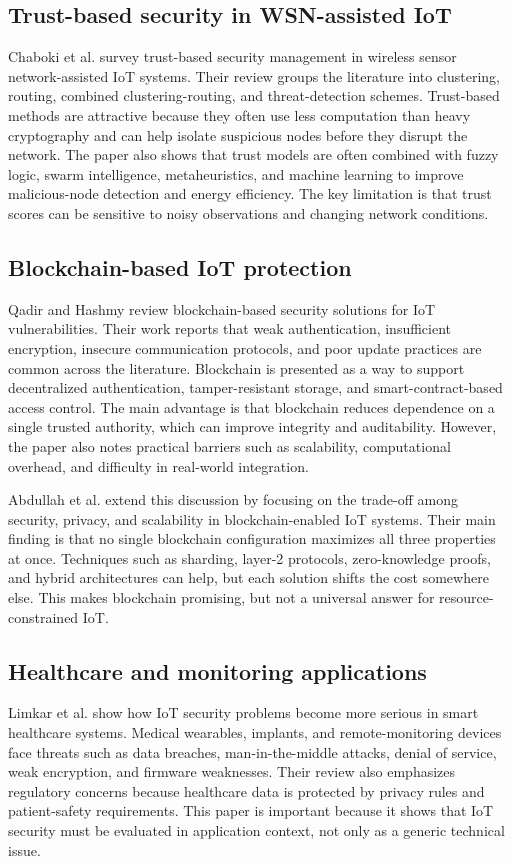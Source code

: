 \documentclass[conference]{IEEEtran}
\begin{document}
\subsection{Trust-based security in WSN-assisted IoT}
Chaboki et al. \cite{trust} survey trust-based security management in wireless sensor network-assisted IoT systems. Their review groups the literature into clustering, routing, combined clustering-routing, and threat-detection schemes. Trust-based methods are attractive because they often use less computation than heavy cryptography and can help isolate suspicious nodes before they disrupt the network. The paper also shows that trust models are often combined with fuzzy logic, swarm intelligence, metaheuristics, and machine learning to improve malicious-node detection and energy efficiency. The key limitation is that trust scores can be sensitive to noisy observations and changing network conditions.

\subsection{Blockchain-based IoT protection}
Qadir and Hashmy \cite{qadir} review blockchain-based security solutions for IoT vulnerabilities. Their work reports that weak authentication, insufficient encryption, insecure communication protocols, and poor update practices are common across the literature. Blockchain is presented as a way to support decentralized authentication, tamper-resistant storage, and smart-contract-based access control. The main advantage is that blockchain reduces dependence on a single trusted authority, which can improve integrity and auditability. However, the paper also notes practical barriers such as scalability, computational overhead, and difficulty in real-world integration.

Abdullah et al. \cite{tradeoff} extend this discussion by focusing on the trade-off among security, privacy, and scalability in blockchain-enabled IoT systems. Their main finding is that no single blockchain configuration maximizes all three properties at once. Techniques such as sharding, layer-2 protocols, zero-knowledge proofs, and hybrid architectures can help, but each solution shifts the cost somewhere else. This makes blockchain promising, but not a universal answer for resource-constrained IoT.

\subsection{Healthcare and monitoring applications}
Limkar et al. \cite{healthcare} show how IoT security problems become more serious in smart healthcare systems. Medical wearables, implants, and remote-monitoring devices face threats such as data breaches, man-in-the-middle attacks, denial of service, weak encryption, and firmware weaknesses. Their review also emphasizes regulatory concerns because healthcare data is protected by privacy rules and patient-safety requirements. This paper is important because it shows that IoT security must be evaluated in application context, not only as a generic technical issue.
\end{document}
